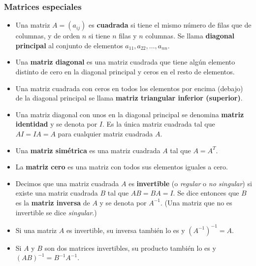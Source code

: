 \documentclass[12pt]{article}
\begin{document}
\subsubsection{Matrices especiales}
\begin{itemize}
\item Una matriz $ A = (a_{ij}) $ es \textbf{cuadrada} si tiene el mismo número de filas que de columnas, y de orden $ n $ si tiene $ n $ filas y $ n $ columnas. Se llama \textbf{diagonal principal} al conjunto de elementos $ a_{11}, a_{22}, \ldots, a_{nn} $.

\item Una \textbf{matriz diagonal} es una matriz cuadrada que tiene algún elemento distinto de cero en la diagonal principal y ceros en el resto de elementos.

\item Una matriz cuadrada con ceros en todos los elementos por encima (debajo) de la diagonal principal se llama \textbf{matriz triangular inferior (superior)}.

\item Una matriz diagonal con unos en la diagonal principal se denomina \textbf{matriz identidad} y se denota por $I$. Es la única matriz cuadrada tal que $ AI = IA = A $ para cualquier matriz cuadrada $A$.

\item Una \textbf{matriz simétrica} es una matriz cuadrada $A$ tal que $A=A^T$.

\item La \textbf{matriz cero} es una matriz con todos sus elementos iguales a cero.

\item Decimos que una matriz cuadrada $A$ es \textbf{invertible} (o \textit{regular} o \textit{no singular}) si existe una matriz cuadrada $ B $ tal que $AB = BA = I$. Se dice entonces que $ B $ es la \textbf{matriz inversa} de $A$ y se denota por $A^{-1}$. (Una matriz que no es invertible se dice \textit{singular}.)

\item Si una matriz $ A $ es invertible, su inversa también lo es y $(A^{-1})^{-1} = A$.

\item Si $A$ y $B$ son dos matrices invertibles, su producto también lo es y $(AB)^{-1} = B^{-1}A^{-1}$.
\end{itemize}

\end{document}

